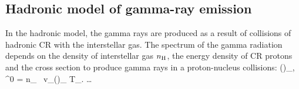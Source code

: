 







\subsection{Hadronic model of gamma-ray emission}
\label{sec:Pion_model}

In the hadronic model, the gamma rays are produced as a result of collisions of hadronic CR with the interstellar gas.
The spectrum of the gamma radiation depends on the density of interstellar gas $n_{\text{H}}$, the energy density of CR protons and the cross section to produce gamma rays in a proton-nucleus collisions:
\be
\left(\right)_{\!\!\gamma, \pi^0}\! = \int n_\Hy\  v_\pr \left(\right)_{\!\!\pr} \de T_\pr.
\ee
\dots